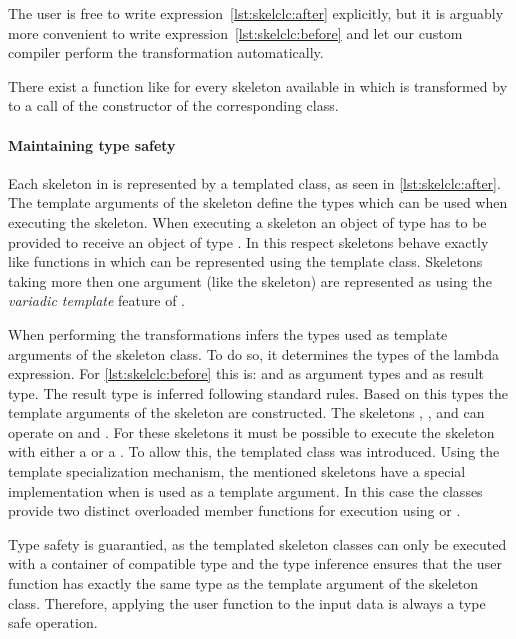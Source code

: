 The user is free to write expression~\ref{lst:skelclc:after} explicitly, but it is arguably more convenient to write expression~\ref{lst:skelclc:before} and let our custom compiler perform the transformation automatically.

There exist a function like  for every skeleton available in \SkelCL which is transformed by  to a call of the constructor of the corresponding class.

\paragraph{Maintaining type safety}
Each skeleton in \SkelCL is represented by a templated class, as seen in \autoref{lst:skelclc:after}.
The template arguments of the skeleton define the types which can be used when executing the skeleton.
When executing a skeleton  an object of type  has to be provided to receive an object of type .
In this respect skeletons behave exactly like functions in \Cpp which can be represented using the  template class.
Skeletons taking more then one argument (like the  skeleton) are represented as  using the \emph{variadic template} feature of \Cpp.

When performing the transformations  infers the types used as template arguments of the skeleton class.
To do so, it determines the types of the lambda expression.
For \autoref{lst:skelclc:before} this is:  and  as argument types and  as result type.
The result type is inferred following standard \Cpp rules.
Based on this types the template arguments of the skeleton are constructed.
The skeletons \map, \zip, and \stencil can operate on  and .
For these skeletons it must be possible to execute the skeleton with either a  or a .
To allow this, the templated class  was introduced.
Using the template specialization mechanism, the mentioned skeletons have a special implementation when  is used as a template argument.
In this case the classes provide two distinct overloaded member functions for execution using  or .

Type safety is guarantied, as the templated skeleton classes can only be executed with a container of compatible type and the type inference ensures that the user function has exactly the same type as the template argument of the skeleton class.
Therefore, applying the user function to the input data is always a type safe operation.

